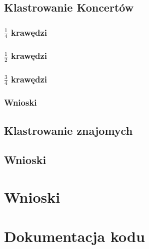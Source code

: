 \documentclass[10pt,a4paper,epic,carom]{article}
\begin{document}
\subsection{Klastrowanie Koncertów}
\subsubsection {$\frac{1}{4}$ krawędzi}
\subsubsection {$\frac{1}{2}$ krawędzi}
\subsubsection {$\frac{3}{4}$ krawędzi}
\subsubsection {Wnioski}
\subsection {Klastrowanie znajomych}

\subsection{Wnioski}


\section{Wnioski}
\section {Dokumentacja kodu}
\end{document}
